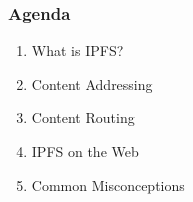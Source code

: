 \documentclass{../shipyard-slide}
\begin{document}
\begin{frame}
  \frametitle{Agenda}
  \begin{enumerate}
    \item What is IPFS?
    \item Content Addressing
    \item Content Routing
    \item IPFS on the Web
    \item Common Misconceptions
  \end{enumerate}
\end{frame}

%
\end{document}
